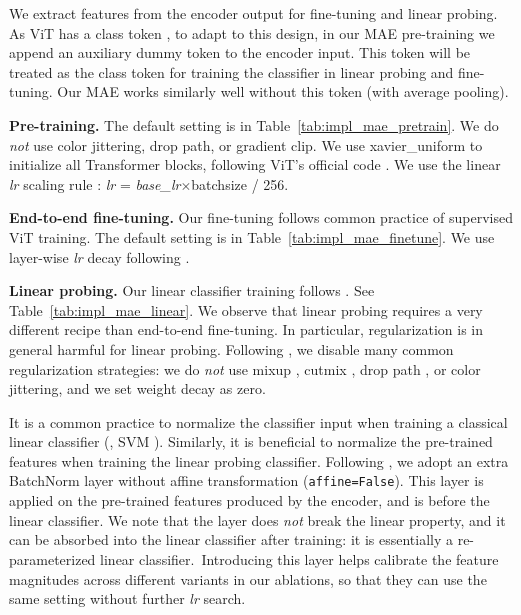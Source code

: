 \documentclass[10pt,twocolumn,letterpaper]{article}
\renewcommand{\paragraph}[1]{\vspace{1.25mm}\noindent\textbf{#1}}
\begin{document}
We extract features from the encoder output for fine-tuning and linear probing. As ViT has a class token \cite{Dosovitskiy2021}, to adapt to this design, in our MAE pre-training we append an auxiliary dummy token to the encoder input. This token will be treated as the class token for training the classifier in linear probing and fine-tuning. Our MAE works similarly well without this token (with average pooling).

\paragraph{Pre-training.} The default setting is in Table~\ref{tab:impl_mae_pretrain}. We do \textit{not} use color jittering, drop path, or gradient clip. We use xavier\_uniform \cite{Glorot2010} to initialize all Transformer blocks, following ViT's official code \cite{Dosovitskiy2021}. We use the linear \textit{lr} scaling rule \cite{Goyal2017}: \textit{lr} = \textit{base\_lr}$\times$batchsize / 256.

\paragraph{End-to-end fine-tuning.} Our fine-tuning follows common practice of supervised ViT training. The default setting is in Table~\ref{tab:impl_mae_finetune}. We use layer-wise \textit{lr} decay \cite{Clark2020} following \cite{Bao2021}.

\paragraph{Linear probing.} Our linear classifier training follows \cite{Chen2021a}. See Table~\ref{tab:impl_mae_linear}. We observe that linear probing requires a very different recipe than end-to-end fine-tuning. In particular, regularization is in general harmful for linear probing. Following \cite{Chen2021a}, we disable many common regularization strategies: we do \textit{not} use mixup \cite{Zhang2018a}, cutmix \cite{Yun2019}, drop path \cite{Huang2016}, or color jittering, and we set weight decay as zero.

It is a common practice to normalize the classifier input when training a classical linear classifier (\eg, SVM \cite{Cortes1995}). Similarly, it is beneficial to normalize the pre-trained features when training the linear probing classifier. Following \cite{Doersch2015}, we adopt an extra BatchNorm layer \cite{Ioffe2015} without affine transformation (\texttt{\small affine=False}). This layer is applied on the pre-trained features produced by the encoder, and is before the linear classifier. We note that the layer does \textit{not} break the linear property, and it can be absorbed into the linear classifier after training: it is essentially a re-parameterized linear classifier.\footnotemark~Introducing this layer helps calibrate the feature magnitudes across different variants in our ablations, so that they can use the same setting without further \textit{lr} search.
\end{document}
